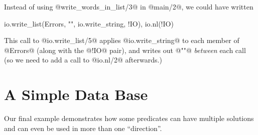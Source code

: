 Instead of using @write_words_in_list/3@ in @main/2@, we could have written
\begin{myverbatim}
    io.write_list(Errors, "\n", io.write_string, !IO),
    io.nl(!IO)
\end{myverbatim}
This call to @io.write_list/5@ applies @io.write_string@ to each member of
@Errors@ (along with the @!IO@ pair), and writes out @"\n"@ \emph{between}
each call (so we need to add a call to @io.nl/2@ afterwards.)



\section{A Simple Data Base}

Our final example demonstrates how some predicates can have
multiple solutions and can even be used in more than one ``direction''.

